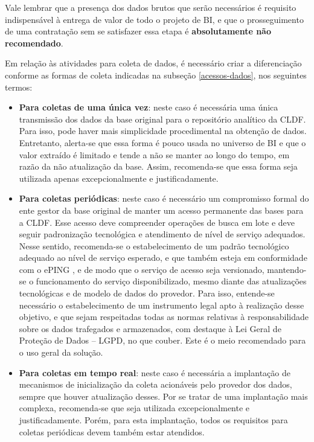     Vale lembrar que a presença dos dados brutos que serão necessários é requisito indispensável à entrega de valor de todo o projeto de BI, e que o prosseguimento de uma contratação sem se satisfazer essa etapa é \textbf{absolutamente não recomendado}.
    
    Em relação às atividades para coleta de dados, é necessário criar a diferenciação conforme as formas de coleta indicadas na subseção \ref{acessos-dados}, nos seguintes termos:
    \begin{itemize}
        \item \textbf{Para coletas de uma única vez}: neste caso é necessária uma única transmissão dos dados da base original para o repositório analítico da CLDF. Para isso, pode haver mais simplicidade procedimental na obtenção de dados. Entretanto, alerta-se que essa forma é pouco usada no universo de BI e que o valor extraído é limitado e tende a não se manter ao longo do tempo, em razão da não atualização da base. Assim, recomenda-se que essa forma seja utilizada apenas excepcionalmente e justificadamente.
        \item \textbf{Para coletas periódicas}: neste caso é necessário um compromisso formal do ente gestor da base original de manter um acesso permanente das bases para a CLDF. Esse acesso deve compreender operações de busca em lote e deve seguir padronização tecnológica e atendimento de nível de serviço adequados. Nesse sentido, recomenda-se o estabelecimento de um padrão tecnológico adequado ao nível de serviço esperado, e que também esteja em conformidade com o ePING \cite{e-ping}, e de modo que o serviço de acesso seja versionado, mantendo-se o funcionamento do serviço disponibilizado, mesmo diante das atualizações tecnológicas e de modelo de dados do provedor. Para isso, entende-se necessário o estabelecimento de um instrumento legal apto à realização desse objetivo, e que sejam respeitadas todas as normas relativas à responsabilidade sobre os dados trafegados e armazenados, com destaque à Lei Geral de Proteção de Dados -- LGPD, no que couber. Este é o meio recomendado para o uso geral da solução.
        \item \textbf{Para coletas em tempo real}: neste caso é necessária a implantação de mecanismos de inicialização da coleta acionáveis pelo provedor dos dados, sempre que houver atualização desses. Por se tratar de uma implantação mais complexa, recomenda-se que seja utilizada excepcionalmente e justificadamente. Porém, para esta implantação, todos os requisitos para coletas periódicas devem também estar atendidos.
    \end{itemize}
    
